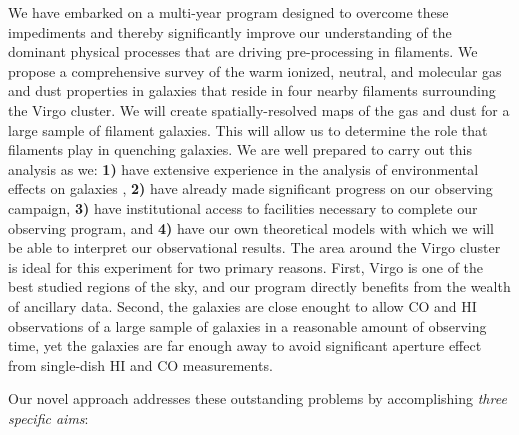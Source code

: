 \documentclass[11pt, preprint]{aastex}
\begin{document}

 We have embarked on a multi-year program designed to overcome these
 impediments and thereby significantly improve our understanding of the dominant physical processes that are driving
  pre-processing in filaments.  
We propose a
comprehensive survey of the warm ionized, neutral, and
molecular gas and dust properties in galaxies that reside in four nearby
filaments surrounding the Virgo cluster.  We will
create spatially-resolved maps of the gas and dust for a large sample
of filament galaxies.  %
This will allow us to determine the
role that filaments play in quenching galaxies.  We are well prepared to carry
out this analysis as we: \textbf{1)} have extensive experience in the
analysis of environmental effects on galaxies \citep{Poggianti06, Desai07a,Rudnick09, Finn10, Cantale16},
\textbf{2)} have already made significant progress on our observing
campaign, 
\textbf{3)} have institutional access to
facilities necessary to complete our observing program, and
\textbf{4)} have our own theoretical models with which we will be able
to interpret our observational results.  The area around the Virgo
cluster is ideal for this experiment for two primary reasons.  First,
Virgo is one of the best studied regions of the sky, and our program
directly benefits from the wealth of ancillary data.  Second, the
galaxies are close enought to allow CO and HI observations of a large
sample of galaxies in a reasonable amount of observing time, yet the galaxies are far enough away to avoid significant aperture effect from single-dish HI and CO measurements.

Our novel approach addresses these outstanding problems by
accomplishing {\it three specific aims}: 
\end{document}
